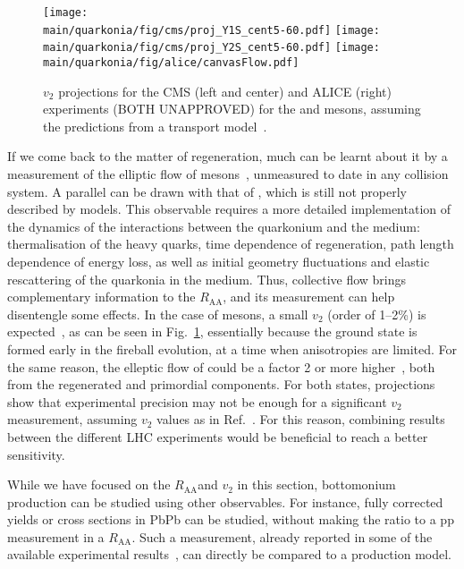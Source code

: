 \documentclass[../report.tex]{subfiles}
\providecommand{\main}{..}
\providecommand{\raa}{\ensuremath{R_\text{AA}}\Xspace}
\begin{document}
\begin{figure}
\begin{center}
 \texttt{[image: \\main/quarkonia/fig/cms/proj\_Y1S\_cent5-60.pdf]}
 \texttt{[image: \\main/quarkonia/fig/cms/proj\_Y2S\_cent5-60.pdf]}
 \texttt{[image: \\main/quarkonia/fig/alice/canvasFlow.pdf]}
\end{center}

 \caption{$v_2$ projections for the CMS (left and center) and ALICE (right) experiments (BOTH UNAPPROVED) for the  and  mesons, assuming the predictions from a transport model~\cite{Du:2017qkv}.}
 \label{fig:upsi_v2}
\end{figure}

If we come back to the matter of regeneration, much can be learnt about it by a measurement of the elliptic flow of  mesons~\cite{Das:2018xel}, 
unmeasured to date in any collision system. 
A parallel can be
drawn with that of \PJgy, which is still not properly described by models. This observable requires a more detailed implementation of the dynamics of the interactions between the 
quarkonium and the medium: thermalisation of the heavy quarks, time dependence of regeneration, path length dependence of energy loss, as well as initial geometry fluctuations and 
elastic rescattering of the quarkonia in the medium. Thus, collective flow brings complementary information to the \raa, and its measurement can help disentengle some
effects. In the case of  mesons, a small $v_2$ (order of 1--2\%) is expected~\cite{Du:2017qkv,Yao:2018zrg}, as can be seen in Fig.~\ref{fig:upsi_v2},
essentially because the ground state is formed early in the fireball evolution, at a time when 
anisotropies are limited. For the same reason, the elleptic flow of  could be a factor 2 or more higher~\cite{Du:2017qkv}, both from the regenerated and primordial
components. For both states, projections show that experimental precision may not be enough for a significant $v_2$ measurement, assuming $v_2$ values as in Ref.~\cite{Du:2017qkv}. For this reason,
combining results between the different LHC experiments would be beneficial to reach a better sensitivity.

While we have focused on the \raa and $v_2$ in this section, bottomonium production can be studied using other observables. For instance, fully corrected yields or cross sections
in PbPb can be studied, without making the ratio to a pp measurement in a \raa. Such a measurement, already reported in some of the available experimental results~\cite{Sirunyan:2018nsz},
can directly be compared to a production model. 
\end{document}
